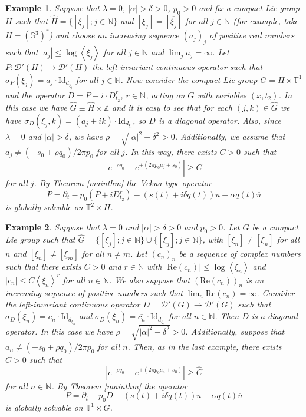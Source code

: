 \documentclass[sn-mathphys-num]{sn-jnl}%
\numberwithin{equation}{section}
\theoremstyle{thmstyleone}
\theoremstyle{thmstyletwo}
\newtheorem{example}{Example}[section]
\theoremstyle{thmstylethree}
\renewcommand{\Re}{\textrm{Re}}
\def\jp#1{{\left\langle{#1}\right\rangle}}
\begin{document}
 \begin{example} Suppose that $\lambda=0$, $|\alpha|>\delta>0$, $p_0>0$ and fix a compact Lie group $H$ such that $\widehat{H}=\{[\xi_j]; j \in \mathbb{N}\}$ and $[\xi_j]=[\overline{\xi_j}]$ for all $j \in \mathbb{N}$ (for example, take $H=(\mathbb{S}^3)^r$) and choose an increasing sequence $(a_j)_j$ of positive real numbers such that $|a_j| \leq \log \jp{\xi_j}$ for all $j\in \mathbb{N}$ and $\lim_j a_j=\infty$. Let $P: \mathcal{D}'(H) \rightarrow \mathcal{D}'(H)$ the left-invariant continuous operator such that $\sigma_P(\xi_j) = a_j \cdot \textrm{Id}_{d_{\xi_j}}$ for all $j \in \mathbb{N}$. Now consider the compact Lie group $G=H \times \mathbb{T}^1$ and the operator $D=P+i \cdot D_{t_2}^r$, $r \in \mathbb{N}$, acting on $G$ with variables $(x,t_2)$. In this case we have $\widehat{G} \equiv \widehat{H} \times \mathbb{Z}$ and it is easy to see that for each $(j,k) \in \widehat{G}$ we have $\sigma_D(\xi_j,k)=(a_j+ik)\cdot \textrm{Id}_{d_{\xi_j}}$, so $D$ is a diagonal operator. Also, since $\lambda=0$ and $|\alpha|>\delta$, we have $\rho=\sqrt{|\alpha|^2-\delta^2}>0$. Additionally, we assume that $a_j \neq (-s_0\pm \rho q_0)/2\pi p_0$ for all $j$. In this way, there exists $C>0$ such that 
 	$$|e^{-\rho q_0} -e^{\pm(2\pi p_0 a_j+s_0)}| \geq C$$
 	for all $j$. By Theorem \ref{mainthm} the Vekua-type operator $$P=\partial_t-p_0(P+iD_{t_2}^r)-(s(t)+i\delta q(t))u-\alpha q(t)\overline{u}$$ 
 is globally solvable on $\mathbb{T}^2 \times H$.
 	
 \end{example} 
 
 \begin{example} Suppose that $\lambda =0$ and $|\alpha|>\delta>0$ and $p_0 >0$. Let $G$ be a compact Lie group such that $\widehat{G}=\{[\xi_j]; j \in \mathbb{N}\}\cup \{[\overline{\xi_j}]; j \in \mathbb{N}\}$, with $[\xi_n]\neq [\overline{\xi_n}]$ for all $n$ and $[\xi_n] \neq [\xi_m]$ for all $n \neq m$. Let $(c_n)_n$ be a sequence of complex numbers such that there exists $C>0$ and $r \in \mathbb{N}$ with $|\Re(c_n)|\leq \log \jp{\xi_n}$ and $|c_n| \leq C \jp{\xi_n}^r$ for all $n\in \mathbb{N}$. We also suppose that $(\Re(c_n))_n$ is an increasing sequence of positive numbers such that $\lim_n \Re(c_n)=\infty$. Consider the left-invariant continuous operator $D=\mathcal{D}'(G) \rightarrow \mathcal{D}'(G)$ such that $\sigma_D(\xi_n)=c_n \cdot \textrm{Id}_{d_{\xi_n}}$ and $\sigma_D(\overline{\xi_n}) = \overline{c_n}\cdot \textrm{Id}_{d_{\xi_n}}$ for all $n\in \mathbb{N}$. Then $D$ is a diagonal operator. In this case we have $\rho=\sqrt{|\alpha|^2-\delta^2}>0$. Additionally, suppose that $a_n \neq (-s_0\pm \rho q_0)/2\pi p_0$ for all $n$. Then, as in the last example, there exists $\widehat{C}>0$ such that
 	$$|e^{-\rho q_0} - e^{\pm( 2\pi p_0 c_n+s_0)}| \geq \widehat{C}$$
 for all $n\in \mathbb{N}$. By Theorem \ref{mainthm} the operator
 $$P=\partial_t -p_0 D -(s(t)+i\delta q(t))u - \alpha q(t)\overline{u}$$
 is globally solvable on $\mathbb{T}^1 \times G$.
 	
 \end{example} 
 
\end{document}
